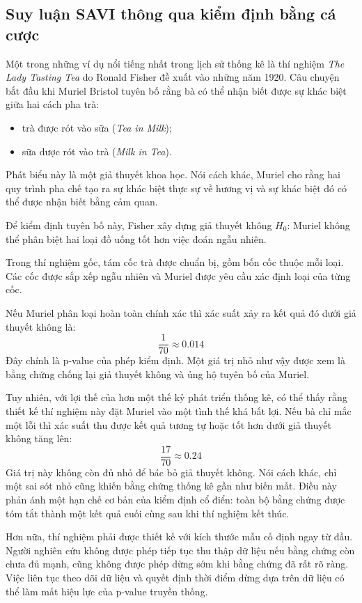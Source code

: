 \subsection{Suy luận SAVI thông qua kiểm định bằng cá cược}

Một trong những ví dụ nổi tiếng nhất trong lịch sử thống kê là thí nghiệm \textit{The Lady Tasting Tea} do Ronald Fisher đề xuất vào những năm 1920. Câu chuyện bắt đầu khi Muriel Bristol tuyên bố rằng bà có thể nhận biết được sự khác biệt giữa hai cách pha trà:

\begin{itemize}
    \item trà được rót vào sữa (\textit{Tea in Milk});
    \item sữa được rót vào trà (\textit{Milk in Tea}).
\end{itemize}

Phát biểu này là một giả thuyết khoa học. Nói cách khác, Muriel cho rằng hai quy trình pha chế tạo ra sự khác biệt thực sự về hương vị và sự khác biệt đó có thể được nhận biết bằng cảm quan.

Để kiểm định tuyên bố này, Fisher xây dựng giả thuyết không $H_0$: Muriel không thể phân biệt hai loại đồ uống tốt hơn việc đoán ngẫu nhiên.

Trong thí nghiệm gốc, tám cốc trà được chuẩn bị, gồm bốn cốc thuộc mỗi loại. Các cốc được sắp xếp ngẫu nhiên và Muriel được yêu cầu xác định loại của từng cốc.

Nếu Muriel phân loại hoàn toàn chính xác thì xác suất xảy ra kết quả đó dưới giả thuyết không là:
\[
    \frac{1}{70} \approx 0.014
\]
Đây chính là p-value của phép kiểm định. Một giá trị nhỏ như vậy được xem là bằng chứng chống lại giả thuyết không và ủng hộ tuyên bố của Muriel.

Tuy nhiên, với lợi thế của hơn một thế kỷ phát triển thống kê, có thể thấy rằng thiết kế thí nghiệm này đặt Muriel vào một tình thế khá bất lợi. Nếu bà chỉ mắc một lỗi thì xác suất thu được kết quả tương tự hoặc tốt hơn dưới giả thuyết không tăng lên:
\[
    \frac{17}{70} \approx 0.24
\]
Giá trị này không còn đủ nhỏ để bác bỏ giả thuyết không. Nói cách khác, chỉ một sai sót nhỏ cũng khiến bằng chứng thống kê gần như biến mất. Điều này phản ánh một hạn chế cơ bản của kiểm định cổ điển: toàn bộ bằng chứng được tóm tắt thành một kết quả cuối cùng sau khi thí nghiệm kết thúc.

Hơn nữa, thí nghiệm phải được thiết kế với kích thước mẫu cố định ngay từ đầu. Người nghiên cứu không được phép tiếp tục thu thập dữ liệu nếu bằng chứng còn chưa đủ mạnh, cũng không được phép dừng sớm khi bằng chứng đã rất rõ ràng. Việc liên tục theo dõi dữ liệu và quyết định thời điểm dừng dựa trên dữ liệu có thể làm mất hiệu lực của p-value truyền thống.

